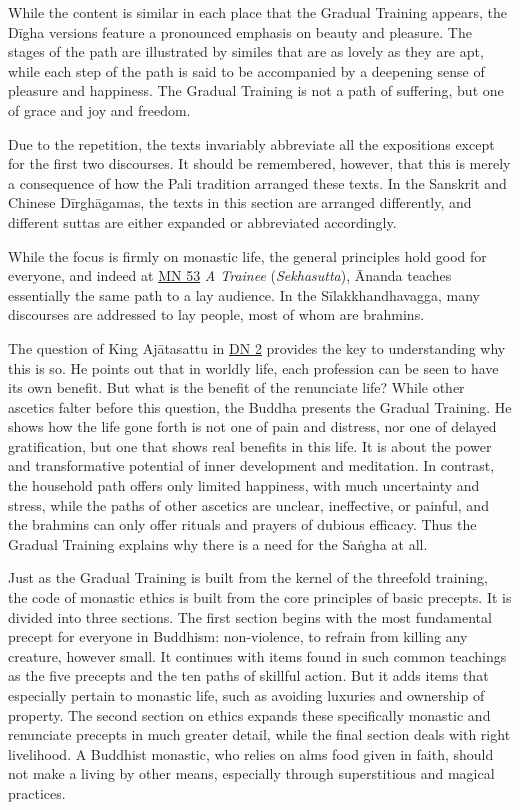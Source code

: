 \documentclass[12pt,openany]{book}%
\begin{document}
While the content is similar in each place that the Gradual Training appears, the \textsanskrit{Dīgha} versions feature a pronounced emphasis on beauty and pleasure. The stages of the path are illustrated by similes that are as lovely as they are apt, while each step of the path is said to be accompanied by a deepening sense of pleasure and happiness. The Gradual Training is not a path of suffering, but one of grace and joy and freedom.

Due to the repetition, the texts invariably abbreviate all the expositions except for the first two discourses. It should be remembered, however, that this is merely a consequence of how the Pali tradition arranged these texts. In the Sanskrit and Chinese \textsanskrit{Dīrghāgamas}, the texts in this section are arranged differently, and different suttas are either expanded or abbreviated accordingly.

While the focus is firmly on monastic life, the general principles hold good for everyone, and indeed at \href{https://suttacentral.net/mn53}{MN 53} \textit{A Trainee} (\textit{Sekhasutta}), Ānanda teaches essentially the same path to a lay audience. In the \textsanskrit{Sīlakkhandhavagga}, many discourses are addressed to lay people, most of whom are brahmins.

The question of King \textsanskrit{Ajātasattu} in \href{https://suttacentral.net/dn2}{DN 2} provides the key to understanding why this is so. He points out that in worldly life, each profession can be seen to have its own benefit. But what is the benefit of the renunciate life? While other ascetics falter before this question, the Buddha presents the Gradual Training. He shows how the life gone forth is not one of pain and distress, nor one of delayed gratification, but one that shows real benefits in this life. It is about the power and transformative potential of inner development and meditation. In contrast, the household path offers only limited happiness, with much uncertainty and stress, while the paths of other ascetics are unclear, ineffective, or painful, and the brahmins can only offer rituals and prayers of dubious efficacy. Thus the Gradual Training explains why there is a need for the \textsanskrit{Saṅgha} at all.

Just as the Gradual Training is built from the kernel of the threefold training, the code of monastic ethics is built from the core principles of basic precepts. It is divided into three sections. The first section begins with the most fundamental precept for everyone in Buddhism: non-violence, to refrain from killing any creature, however small. It continues with items found in such common teachings as the five precepts and the ten paths of skillful action. But it adds items that especially pertain to monastic life, such as avoiding luxuries and ownership of property. The second section on ethics expands these specifically monastic and renunciate precepts in much greater detail, while the final section deals with right livelihood. A Buddhist monastic, who relies on alms food given in faith, should not make a living by other means, especially through superstitious and magical practices.
\end{document}
